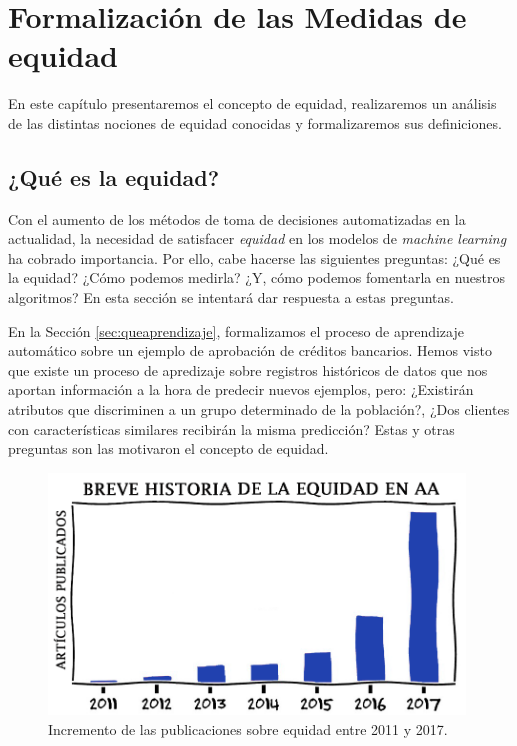 \documentclass[oneside,openright,titlepage,numbers=noenddot,openany,headinclude,footinclude=true,
cleardoublepage=empty,abstractoff,BCOR=5mm,paper=a4,fontsize=12pt,main=spanish]{scrreprt}
\begin{document}
\chapter{Formalización de las Medidas de equidad}

\label{ch:formalmedeq}

En este capítulo presentaremos el concepto de equidad, realizaremos un análisis de las distintas nociones de equidad conocidas y formalizaremos sus definiciones.

\section{¿Qué es la equidad?}

Con el aumento de los métodos de toma de decisiones automatizadas en la actualidad, la necesidad de satisfacer \textit{equidad} en los modelos de \textit{machine learning} ha cobrado importancia. Por ello, cabe hacerse las siguientes preguntas: ¿Qué es la equidad? ¿Cómo podemos medirla? ¿Y, cómo podemos fomentarla en nuestros algoritmos? En esta sección se intentará dar respuesta a estas preguntas.

En la Sección \ref{sec:queaprendizaje}, formalizamos el proceso de aprendizaje automático sobre un ejemplo de aprobación de créditos bancarios. Hemos visto que existe un proceso de apredizaje sobre registros históricos de datos que nos aportan información a la hora de predecir nuevos ejemplos, pero: ¿Existirán atributos que discriminen a un grupo determinado de la población?, ¿Dos clientes con características similares recibirán la misma predicción? Estas y otras preguntas son las motivaron el concepto de equidad.\\

\begin{figure}[h]
	\centering
	\includegraphics[width=11.05cm]{exponencial.png}
	\caption{Incremento de las publicaciones sobre equidad entre 2011 y 2017.}
\end{figure}
\end{document}
